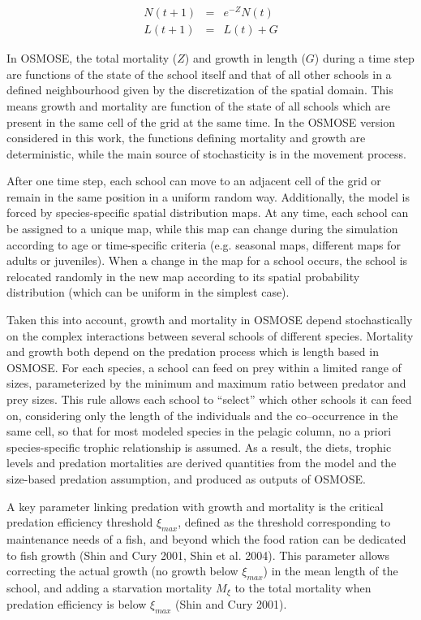 \begin{eqnarray}
N(t+1) & = & e^{-Z}N(t)\\
L(t+1) & = & L(t) + G
\end{eqnarray}


In OSMOSE, the total mortality ($Z$) and growth in length ($G$) during a time step are functions of the state of the school itself and that of all other schools in a defined neighbourhood given by the discretization of the spatial domain. This means growth and mortality are function of the state of all schools which are present in the same cell of the grid at the same time. In the OSMOSE version considered in this work, the functions defining mortality and growth are deterministic, while the main source of stochasticity is in the movement process. 

After one time step, each school can move to an adjacent cell of the grid or remain in the same position in a uniform random way. Additionally, the model is forced by species-specific spatial distribution maps. At any time, each school can be assigned to a unique map, while this map can change during the simulation according to age or time-specific criteria (e.g. seasonal maps, different maps for adults or juveniles). When a change in the map for a school occurs, the school is relocated randomly in the new map according to its spatial probability distribution (which can be uniform in the simplest case).

Taken this into account, growth and mortality in OSMOSE depend stochastically on the complex interactions between several schools of different species.
Mortality and growth both depend on the predation process which is length based in OSMOSE. For each species, a school can feed on prey within a limited range of sizes, parameterized by the minimum and maximum ratio between predator and prey sizes. This rule allows each school to ``select'' which other schools it can feed on, considering only the length of the individuals and the co--occurrence in the same cell, so that for most modeled species in the pelagic column, no a priori species-specific trophic relationship is assumed. As a result, the diets, trophic levels and predation mortalities are derived quantities from the model and the size-based predation assumption, and produced as outputs of OSMOSE.

A key parameter linking predation with growth and mortality is the critical predation efficiency threshold $\xi_{max}$, defined as the threshold corresponding to maintenance needs of a fish, and beyond which the food ration can be dedicated to fish growth (Shin and Cury 2001, Shin et al. 2004). This parameter allows correcting the actual growth (no growth below $\xi_{max}$) in the mean length of the school, and adding a starvation mortality $M_\xi$ to the total mortality when predation efficiency is below $\xi_{max}$ (Shin and Cury 2001). 


